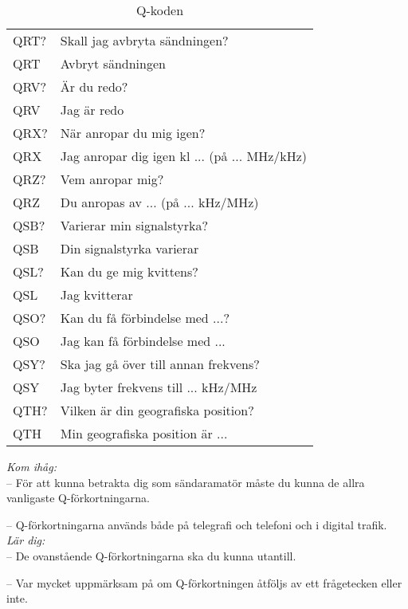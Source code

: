\begin{table}[h]
\begin{tabular}{ll}
    QRT? & Skall jag avbryta sändningen?\\
    QRT  & Avbryt sändningen \\ \hline

    QRV? & Är du redo?\\
    QRV  & Jag är redo\\ \hline

    QRX? & När anropar du mig igen?\\
    QRX  & Jag anropar dig igen kl ... (på ... MHz/kHz)\\ \hline

    QRZ? & Vem anropar mig?\\
    QRZ  & Du anropas av ... (på ... kHz/MHz)\\ \hline

    QSB? & Varierar min signalstyrka?\\
    QSB  & Din signalstyrka varierar\\ \hline

    QSL? & Kan du ge mig kvittens?\\
    QSL  & Jag kvitterar\\ \hline

    QSO? & Kan du få förbindelse med ...?\\
    QSO  & Jag kan få förbindelse med ...\\ \hline

    QSY? & Ska jag gå över till annan frekvens?\\
    QSY  & Jag byter frekvens till ... kHz/MHz\\ \hline

    QTH? & Vilken är din geografiska position?\\
    QTH  & Min geografiska position är ...\\ \hline
  \end{tabular}
  \caption{Q-koden}
  \label{tab:q-koden}
\end{table}
\normalsize

\noindent\emph{Kom ihåg:}\\

-- För att kunna betrakta dig som sändaramatör måste du kunna de allra
vanligaste Q-förkortningarna.

-- Q-förkortningarna används både på telegrafi och telefoni och i digital
trafik.\\

\noindent\emph{Lär dig:}\\

-- De ovanstående Q-förkortningarna ska du kunna
utantill.

-- Var mycket uppmärksam på om Q-förkortningen åtföljs av ett
frågetecken eller inte.

